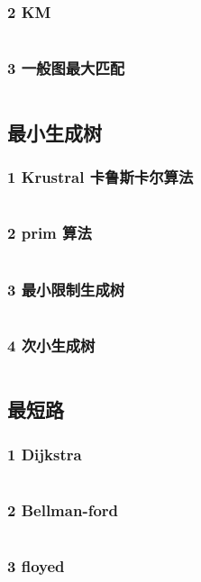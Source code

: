 \documentclass{article}
\begin{document}
\subsubsection{2 KM}
\inputminted{c++}{/home/zzuzxy/t3/ACM-template/3 图论/二分图/2 KM.cpp}
\subsubsection{3 一般图最大匹配}
\inputminted{c++}{/home/zzuzxy/t3/ACM-template/3 图论/二分图/3 一般图最大匹配.cpp}
\subsection{最小生成树}
\subsubsection{1 Krustral 卡鲁斯卡尔算法}
\inputminted{c++}{/home/zzuzxy/t3/ACM-template/3 图论/最小生成树/1 Krustral 卡鲁斯卡尔算法.cpp}
\subsubsection{2 prim 算法}
\inputminted{c++}{/home/zzuzxy/t3/ACM-template/3 图论/最小生成树/2 prim 算法.cpp}
\subsubsection{3 最小限制生成树}
\inputminted{c++}{/home/zzuzxy/t3/ACM-template/3 图论/最小生成树/3 最小限制生成树.cpp}
\subsubsection{4 次小生成树}
\inputminted{c++}{/home/zzuzxy/t3/ACM-template/3 图论/最小生成树/4 次小生成树.cpp}
\subsection{最短路}
\subsubsection{1 Dijkstra}
\inputminted{c++}{/home/zzuzxy/t3/ACM-template/3 图论/最短路/1 Dijkstra.cpp}
\subsubsection{2 Bellman-ford}
\inputminted{c++}{/home/zzuzxy/t3/ACM-template/3 图论/最短路/2 Bellman-ford.cpp}
\subsubsection{3 floyed}
\inputminted{c++}{/home/zzuzxy/t3/ACM-template/3 图论/最短路/3 floyed.cpp}
\end{document}
